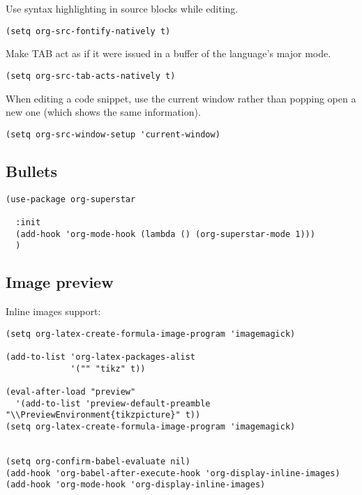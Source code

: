 \documentclass[12pt]{article}
\begin{document}
Use syntax highlighting in source blocks while editing.
\begin{verbatim}
(setq org-src-fontify-natively t)
\end{verbatim}

Make TAB act as if it were issued in a buffer of the language’s major mode.
\begin{verbatim}
(setq org-src-tab-acts-natively t)
\end{verbatim}

When editing a code snippet, use the current window rather than popping open a
new one (which shows the same information).
\begin{verbatim}
(setq org-src-window-setup 'current-window)
\end{verbatim}

\subsection{Bullets}
\label{sec:org42b5d43}

\begin{verbatim}
(use-package org-superstar

  :init
  (add-hook 'org-mode-hook (lambda () (org-superstar-mode 1)))
  )

\end{verbatim}

\subsection{Image preview}
\label{sec:orgef0ff3a}

Inline images support:

\begin{verbatim}
(setq org-latex-create-formula-image-program 'imagemagick)

(add-to-list 'org-latex-packages-alist
             '("" "tikz" t))

(eval-after-load "preview"
  '(add-to-list 'preview-default-preamble "\\PreviewEnvironment{tikzpicture}" t))
(setq org-latex-create-formula-image-program 'imagemagick)


(setq org-confirm-babel-evaluate nil)
(add-hook 'org-babel-after-execute-hook 'org-display-inline-images)
(add-hook 'org-mode-hook 'org-display-inline-images)
\end{verbatim}
\end{document}
